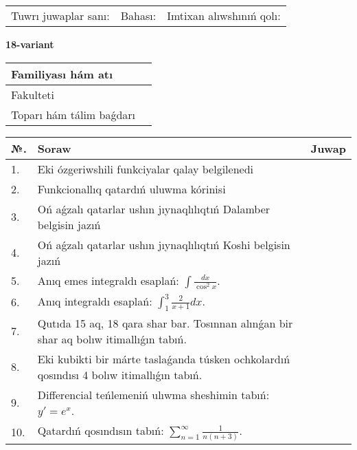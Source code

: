 \documentclass{article}
\begin{document}
\vspace{1cm}

\begin{tabular}{ c c c }
Tuwrı juwaplar sanı: \underline{\hspace{2cm}} & Bahası: \underline{\hspace{2cm}} & Imtixan alıwshınıń qolı: \underline{\hspace{2cm}} \\
\end{tabular}

\newpage

\begin{center}\textbf{18-variant}\end{center}

\bgroup
\def\arraystretch{1.5}
\begin{tabular}{ |m{6cm}|m{10cm}| }
  \hline
  Familiyası hám atı & \\
  \hline
  Fakulteti &\\
  \hline
  Toparı hám tálim baǵdarı & \\
  \hline
\end{tabular}
\egroup

\vspace{0.5cm}

\bgroup
\def\arraystretch{2}
\begin{tabular}{ |l|m{8cm}|m{7cm}| }
  \hline
  №. & Soraw & Juwap \\
  \hline
  1. & Eki ózgeriwshili funkciyalar qalay belgilenedi &  \\
  \hline
  2. & Funkcionallıq qatardıń uluwma kórinisi &  \\
  \hline
  3. & Oń aǵzalı qatarlar ushın jıynaqlılıqtıń Dalamber belgisin jazıń &  \\
  \hline
  4. & Oń aǵzalı qatarlar ushın jıynaqlılıqtıń Koshi belgisin jazıń &  \\
  \hline
  5. & Anıq emes integraldı esaplań: $\displaystyle\int \frac{dx}{\cos^{2}x}$. &  \\
  \hline
  6. & Anıq integraldı esaplań: $\displaystyle\int_{1}^{3}{\frac{2}{x + 1}dx}$. &  \\
  \hline
  7. & Qutıda 15 aq, 18 qara shar bar. Tosınnan alınǵan bir shar aq bolıw itimallıǵın tabıń. &  \\
  \hline
  8. & Eki kubikti bir márte taslaǵanda túsken ochkolardıń qosındısı 4 bolıw itimallıǵın tabıń. &  \\
  \hline
  9. & Differencial teńlemeniń ulıwma sheshimin tabıń: $y'=e^{x}$. &  \\
  \hline
  10. & Qatardıń qosındısın tabıń: $\displaystyle\sum_{n = 1}^{\infty}\frac{1}{n(n + 3)}$. &  \\
  \hline
\end{tabular}
\egroup
\end{document}
